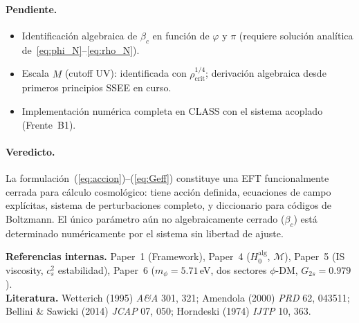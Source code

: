 \documentclass[11pt,a4paper]{article}
\newcommand{\phiG}{\varphi}          %
\newcommand{\MIRA}{\mathcal{M}}      %
\newcommand{\rhocrit}{\rho_{\mathrm{crit}}}
\begin{document}
\paragraph{Pendiente.}
\begin{itemize}
  \item Identificación algebraica de $\beta_c$ en función de $\phiG$ y $\pi$ (requiere solución analítica de~\ref{eq:phi_N}--\ref{eq:rho_N}).
  \item Escala $M$ (cutoff UV): identificada con $\rhocrit^{1/4}$; derivación algebraica desde primeros principios SSEE en curso.
  \item Implementación numérica completa en CLASS con el sistema acoplado (Frente~B1).
\end{itemize}

\paragraph{Veredicto.}
La formulación~(\ref{eq:accion})--(\ref{eq:Geff}) constituye una EFT
funcionalmente cerrada para cálculo cosmológico: tiene acción definida,
ecuaciones de campo explícitas, sistema de perturbaciones completo, y
diccionario para códigos de Boltzmann.  El único parámetro aún no
algebraicamente cerrado ($\beta_c$) está determinado numéricamente por el
sistema sin libertad de ajuste.

\bigskip
\noindent\textbf{Referencias internas.}
Paper~1 (Framework), Paper~4 ($H_0^{\mathrm{alg}}$, $\MIRA$),
Paper~5 (IS viscosity, $c_s^2$ estabilidad),
Paper~6 ($m_\phi = 5.71$\,eV, dos sectores $\phi$-DM, $G_{2s}=0.979$).\\[4pt]
\noindent\textbf{Literatura.}
Wetterich (1995) \textit{A\&A} 301, 321;
Amendola (2000) \textit{PRD} 62, 043511;
Bellini \& Sawicki (2014) \textit{JCAP} 07, 050;
Horndeski (1974) \textit{IJTP} 10, 363.
\end{document}
